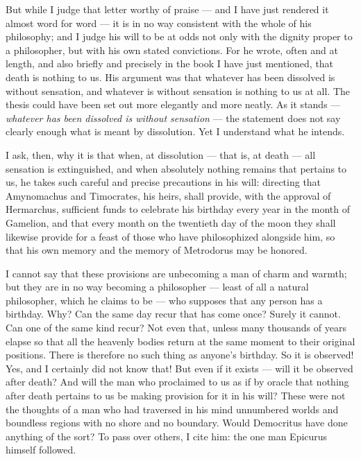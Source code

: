  But while I judge that letter worthy of praise — and I have just rendered it almost word for word — it is in no way consistent with the whole of his philosophy; and I judge his will to be at odds not only with the dignity proper to a philosopher, but with his own stated convictions. For he wrote, often and at length, and also briefly and precisely in the book I have just mentioned, that death is nothing to us. His argument was that whatever has been dissolved is without sensation, and whatever is without sensation is nothing to us at all. The thesis could have been set out more elegantly and more neatly. As it stands — \textit{whatever has been dissolved is without sensation} — the statement does not say clearly enough what is meant by dissolution. Yet I understand what he intends.

 I ask, then, why it is that when, at dissolution — that is, at death — all sensation is extinguished, and when absolutely nothing remains that pertains to us, he takes such careful and precise precautions in his will: directing that Amynomachus and Timocrates, his heirs, shall provide, with the approval of Hermarchus, sufficient funds to celebrate his birthday every year in the month of Gamelion, and that every month on the twentieth day of the moon they shall likewise provide for a feast of those who have philosophized alongside him, so that his own memory and the memory of Metrodorus may be honored.

 I cannot say that these provisions are unbecoming a man of charm and warmth; but they are in no way becoming a philosopher — least of all a natural philosopher, which he claims to be — who supposes that any person has a birthday. Why? Can the same day recur that has come once? Surely it cannot. Can one of the same kind recur? Not even that, unless many thousands of years elapse so that all the heavenly bodies return at the same moment to their original positions. There is therefore no such thing as anyone's birthday. So it is observed! Yes, and I certainly did not know that! But even if it exists — will it be observed after death? And will the man who proclaimed to us as if by oracle that nothing after death pertains to us be making provision for it in his will? These were not the thoughts of a man who had traversed in his mind unnumbered worlds and boundless regions with no shore and no boundary. Would Democritus have done anything of the sort? To pass over others, I cite him: the one man Epicurus himself followed.

